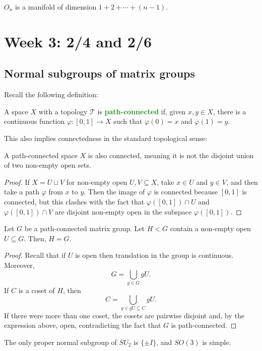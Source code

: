 \documentclass[10pt]{scrartcl}
\providecommand{\vocab}[1]{{\textbf{\textcolor{ForestGreen}{#1}}}}
\begin{document}
\begin{prop}
	$O_n$ is a manifold of dimension $1 + 2 + \cdots + (n-1)$.
\end{prop}

\pagebreak
\section{Week 3: 2/4 and 2/6}
\subsection{Normal subgroups of matrix groups}
Recall the following definition:
\begin{definition}
	A space $X$ with a topology $\mathcal T$ is \vocab{path-connected}
	if, given $x,y\in X$, there is a continuous function $\varphi\colon[0,1]\to X$
	such that $\varphi(0) = x$ and $\varphi(1) = y$.
\end{definition}

This also implies connectedness in the standard topological sense:
\begin{prop}
	A path-connected space $X$ is also connected,
	meaning it is not the disjoint union of two non-empty open sets.
\end{prop}
\begin{proof}
	If $X = U\sqcup V$ for non-empty open $U,V\subseteq X$,
	take $x\in U$ and $y\in V$, and then take a path $\varphi$
	from $x$ to $y$. Then the image of $\varphi$ is connected
	because $[0,1]$ is connected, but this clashes with the fact that
	$\varphi([0,1])\cap U$ and $\varphi([0,1])\cap V$ are disjoint
	non-empty open in the subspace $\varphi([0,1])$.
\end{proof}

\begin{prop}
	Let $G$ be a path-connected matrix group.
	Let $H < G$ contain a non-empty open $U\subseteq G$.
	Then, $H = G$.
\end{prop}

\begin{proof}
	Recall that if $U$ is open then translation in the group is continuous.
	Moreover,
	\[G = \bigcup_{g\in G} gU.\]
	If $C$ is a coset of $H$, then
	\[C = \bigcup_{g\in gU\subseteq C} gU.\]
	If there were more than one coset, the cosets are pairwise disjoint
	and, by the expression above, open, contradicting the fact that $G$
	is path-connected.
\end{proof}

\begin{theorem}
	The only proper normal subgroup of $SU_2$ is $\{\pm I\}$,
	and $SO(3)$ is simple.
\end{theorem}
\end{document}
